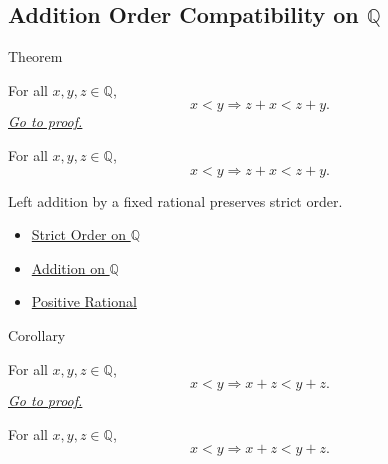 \subsection*{\texorpdfstring{Addition Order Compatibility on $\mathbb{Q}$}{Addition Order Compatibility on Q}}

\begin{theorembox}{Theorem}
\begin{theorem}
\label{thm:left-addition-preserves-strict-order-on-q}
For all $x,y,z\in\mathbb{Q}$,
\[
x<y \Longrightarrow z+x<z+y.
\]
\hyperref[prf:left-addition-preserves-strict-order-on-q]{\textit{Go to proof.}}
\end{theorem}
\end{theorembox}

\begin{remark*}
For all $x,y,z\in\mathbb{Q}$,
\[
x<y\Longrightarrow z+x<z+y.
\]
\end{remark*}

\begin{remark*}[Interpretation]
Left addition by a fixed rational preserves strict order.
\end{remark*}

\begin{dependencies}
\begin{itemize}
  \item \hyperref[def:strict-order-on-q]{Strict Order on $\mathbb{Q}$}
  \item \hyperref[def:addition-on-q-classes]{Addition on $\mathbb{Q}$}
  \item \hyperref[def:positive-rational]{Positive Rational}
\end{itemize}
\end{dependencies}

\begin{corollarybox}{Corollary}
\begin{corollary}
\label{cor:right-addition-preserves-strict-order-on-q}
For all $x,y,z\in\mathbb{Q}$,
\[
x<y \Longrightarrow x+z<y+z.
\]
\hyperref[prf:right-addition-preserves-strict-order-on-q]{\textit{Go to proof.}}
\end{corollary}
\end{corollarybox}

\begin{remark*}
For all $x,y,z\in\mathbb{Q}$,
\[
x<y\Longrightarrow x+z<y+z.
\]
\end{remark*}

